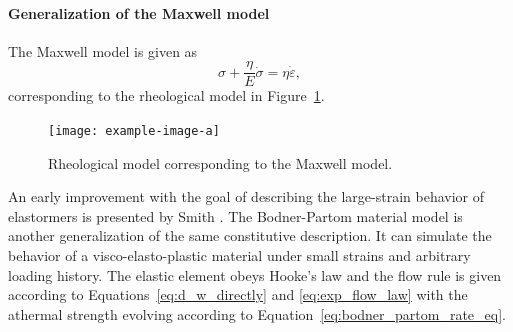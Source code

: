 \paragraph{Generalization of the Maxwell model}
The Maxwell model is given as
\begin{equation}
	\sigma + \frac{\eta}{E}\dot \sigma = \eta \dot \varepsilon,
\end{equation}
corresponding to the rheological model in Figure~\ref{fig:rheo_model_maxwell}.
\begin{figure}
	\centering
	\texttt{[image: example-image-a]}
	\caption{Rheological model corresponding to the Maxwell model.}
\label{fig:rheo_model_maxwell}
\end{figure}
An early improvement with the goal of describing the large-strain behavior of elastormers is presented by Smith \citep{smithNonlinearViscoelasticResponse1962}.
The Bodner-Partom material model \citep{bodnerConstitutiveEquationsElasticViscoplastic1975} is another generalization of the same constitutive description.
It can simulate the behavior of a visco-elasto-plastic material under small strains and arbitrary loading history.
The elastic element obeys Hooke's law and the flow rule is given according to Equations~\eqref{eq:d_w_directly} and \eqref{eq:exp_flow_law} with the athermal strength evolving according to Equation~\eqref{eq:bodner_partom_rate_eq}.
